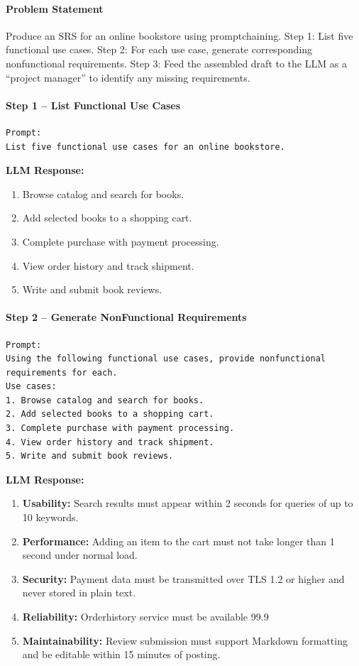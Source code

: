 \documentclass[12pt, a4paper]{article}
\begin{document}
\paragraph{Problem Statement}
Produce an SRS for an online bookstore using promptchaining.  
Step 1: List five functional use cases.  
Step 2: For each use case, generate corresponding nonfunctional requirements.  
Step 3: Feed the assembled draft to the LLM as a ``project manager'' to identify any missing requirements.

\paragraph{Step 1 -- List Functional Use Cases}
\begin{verbatim}
Prompt:
List five functional use cases for an online bookstore.
\end{verbatim}
\textbf{LLM Response:}
\begin{enumerate}
  \item Browse catalog and search for books.
  \item Add selected books to a shopping cart.
  \item Complete purchase with payment processing.
  \item View order history and track shipment.
  \item Write and submit book reviews.
\end{enumerate}

\paragraph{Step 2 -- Generate NonFunctional Requirements}
\begin{verbatim}
Prompt:
Using the following functional use cases, provide nonfunctional
requirements for each.  
Use cases:  
1. Browse catalog and search for books.  
2. Add selected books to a shopping cart.  
3. Complete purchase with payment processing.  
4. View order history and track shipment.  
5. Write and submit book reviews.
\end{verbatim}
\textbf{LLM Response:}
\begin{enumerate}
  \item \textbf{Usability:} Search results must appear within 2 seconds for queries of up to 10 keywords.  
  \item \textbf{Performance:} Adding an item to the cart must not take longer than 1 second under normal load.  
  \item \textbf{Security:} Payment data must be transmitted over TLS 1.2 or higher and never stored in plain text.  
  \item \textbf{Reliability:} Orderhistory service must be available 99.9 %
  \item \textbf{Maintainability:} Review submission must support Markdown formatting and be editable within 15 minutes of posting.
\end{enumerate}
\end{document}
